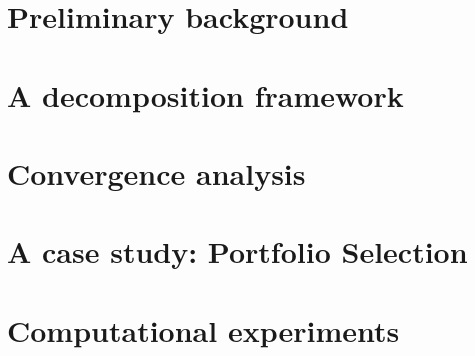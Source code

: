 \documentclass[preprint,12pt]{elsarticle}
\begin{document}
\section{Preliminary background}\label{sect:2}

\clearpage
\section{A decomposition framework}

\clearpage
\section{Convergence analysis}

\clearpage
\section{A case study: Portfolio Selection}

\clearpage
\section{Computational experiments}

\clearpage




\begin{thebibliography}{00}


\end{thebibliography}
\end{document}
